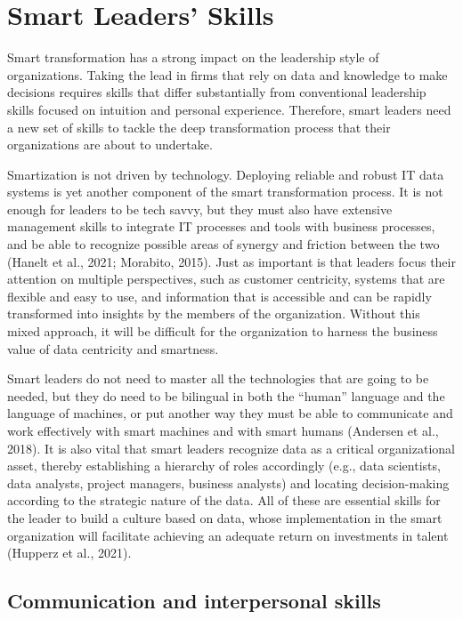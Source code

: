 \documentclass[
  letterpaper,
  DIV=11,
  numbers=noendperiod]{scrreprt}
\begin{document}
\hypertarget{smart-leaders-skills}{%
\section{Smart Leaders' Skills}\label{smart-leaders-skills}}

Smart transformation has a strong impact on the leadership style of
organizations. Taking the lead in firms that rely on data and knowledge
to make decisions requires skills that differ substantially from
conventional leadership skills focused on intuition and personal
experience. Therefore, smart leaders need a new set of skills to tackle
the deep transformation process that their organizations are about to
undertake.

Smartization is not driven by technology. Deploying reliable and robust
IT data systems is yet another component of the smart transformation
process. It is not enough for leaders to be tech savvy, but they must
also have extensive management skills to integrate IT processes and
tools with business processes, and be able to recognize possible areas
of synergy and friction between the two (Hanelt et al., 2021; Morabito,
2015). Just as important is that leaders focus their attention on
multiple perspectives, such as customer centricity, systems that are
flexible and easy to use, and information that is accessible and can be
rapidly transformed into insights by the members of the organization.
Without this mixed approach, it will be difficult for the organization
to harness the business value of data centricity and smartness.

Smart leaders do not need to master all the technologies that are going
to be needed, but they do need to be bilingual in both the ``human''
language and the language of machines, or put another way they must be
able to communicate and work effectively with smart machines and with
smart humans (Andersen et al., 2018). It is also vital that smart
leaders recognize data as a critical organizational asset, thereby
establishing a hierarchy of roles accordingly (e.g., data scientists,
data analysts, project managers, business analysts) and locating
decision-making according to the strategic nature of the data. All of
these are essential skills for the leader to build a culture based on
data, whose implementation in the smart organization will facilitate
achieving an adequate return on investments in talent (Hupperz et al.,
2021).

\hypertarget{communication-and-interpersonal-skills}{%
\subsection{Communication and interpersonal
skills}\label{communication-and-interpersonal-skills}}
\end{document}
